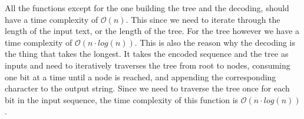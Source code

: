 \documentclass[a4paper,11pt]{article}
\begin{document}
All the functions except for the one building the tree and the decoding, should have a time complexity of $\mathcal{O}(n)$. This since 
we need to iterate through the length of the input text, or the length of the tree. For the tree however we have a time complexity
of $\mathcal{O}(n\cdot log(n))$. This is also the reason why the decoding is the thing that takes the longest. It takes the encoded
sequence and the tree as inputs and need to iteratively traverses the tree from root to nodes, consuming one bit at a time until a 
node is reached, and appending the corresponding character to the output string. Since we need to traverse the tree once for 
each bit in the input sequence, the time complexity of this function is $\mathcal{O}(n\cdot log(n))$.
\end{document}
